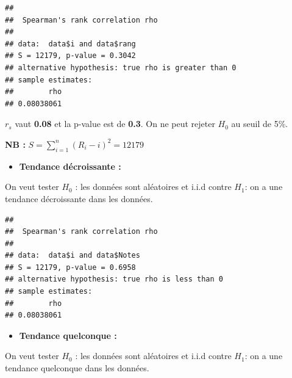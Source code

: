 \documentclass[
  12pt,
]{article}
\newenvironment{Shaded}{\begin{snugshade}}{\end{snugshade}}
\newcommand{\AttributeTok}[1]{\textcolor[rgb]{0.13,0.29,0.53}{#1}}
\newcommand{\FunctionTok}[1]{\textcolor[rgb]{0.13,0.29,0.53}{\textbf{#1}}}
\newcommand{\NormalTok}[1]{#1}
\newcommand{\SpecialCharTok}[1]{\textcolor[rgb]{0.81,0.36,0.00}{\textbf{#1}}}
\newcommand{\StringTok}[1]{\textcolor[rgb]{0.31,0.60,0.02}{#1}}
\providecommand{\tightlist}{%
  \setlength{\itemsep}{0pt}\setlength{\parskip}{0pt}}
\begin{document}
\begin{verbatim}
## 
##  Spearman's rank correlation rho
## 
## data:  data$i and data$rang
## S = 12179, p-value = 0.3042
## alternative hypothesis: true rho is greater than 0
## sample estimates:
##        rho 
## 0.08038061
\end{verbatim}

\(r_s\) vaut \textbf{0.08} et la p-value est de \textbf{0.3}. On ne peut
rejeter \(H_0\) au seuil de 5\%.

\textbf{NB :} \(S = \sum_{i=1}^{n} \left(R_i - i\right)^2 = 12179\)

\begin{itemize}
\tightlist
\item
  \textbf{Tendance décroissante :}
\end{itemize}

On veut tester \(H_0\) : les données sont aléatoires et i.i.d contre
\(H_1\): on a une tendance décroissante dans les données.

\begin{Shaded}
\end{Shaded}

\begin{verbatim}
## 
##  Spearman's rank correlation rho
## 
## data:  data$i and data$Notes
## S = 12179, p-value = 0.6958
## alternative hypothesis: true rho is less than 0
## sample estimates:
##        rho 
## 0.08038061
\end{verbatim}

\begin{itemize}
\tightlist
\item
  \textbf{Tendance quelconque :}
\end{itemize}

On veut tester \(H_0\) : les données sont aléatoires et i.i.d contre
\(H_1\): on a une tendance quelconque dans les données.

\begin{Shaded}
\end{Shaded}
\end{document}
